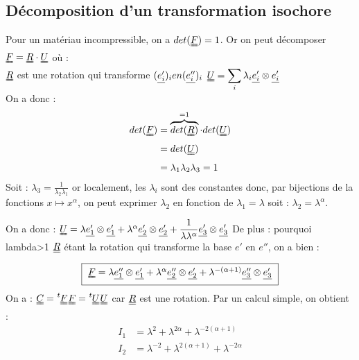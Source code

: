 \documentclass[a4paper,11pt]{article}
\newcommand{\trans}[1]{\tensor[^t]{#1}{}}
\newcommand{\SUM}{\displaystyle\sum}
\newcommand{\FRAC}{\displaystyle\frac}
\newcommand{\tens}{\uuline}
\begin{document}
\subsection{Décomposition d'un transformation isochore}
Pour un matériau incompressible, on a $det(\tens{F}) = 1$.
Or on peut décomposer $\tens{F} = \tens{R}\cdot \tens{U}$ où :\\
$\tens{R}$ est une rotation qui transforme $(\uline{e'_i})_i en (\uline{e''_i})_i$
$\tens{U} = \SUM_i \lambda_i \uline{e'_i} \otimes \uline{e'_i}$
\\
On a donc :
\begin{align*}
det(\tens{F}) &= \overbrace{det(\tens{R})}^{=1} \cdot det(\tens{U}) \\
&= det(\tens{U}) \\
&= \lambda_1 \lambda_2 \lambda_3 = 1\\
\end{align*}
Soit : $\lambda_3 = \FRAC{1}{\lambda_2 \lambda_1}$ or localement, les $\lambda_i$ sont des constantes donc, par bijections de la fonctions $x \mapsto x^\alpha$, on peut exprimer $\lambda_2$ en fonction de $\lambda_1 = \lambda$ soit : $\lambda_2 = \lambda^\alpha$.

On a donc : $\tens{U} = \lambda \uline{e'_1} \otimes \uline{e'_1} + \lambda^\alpha \uline{e'_2} \otimes \uline{e'_2} + \FRAC{1}{\lambda \lambda^\alpha} \uline{e'_3} \otimes \uline{e'_3}$
De plus : pourquoi lambda>1
$\tens{R}$ étant la rotation qui transforme la base $e'$ en $e''$, on a bien :
\begin{equation}
\fbox{
$
\tens{F} = \lambda \uline{e''_1} \otimes \uline{e'_1} + \lambda^\alpha \uline{e''_2} \otimes \uline{e'_2} + \lambda^{-(\alpha +1)} \uline{e''_3} \otimes \uline{e'_3}
$
}
\end{equation}
On a : $\tens{C} = \trans{\tens{F}} \tens{F} = \trans{\tens{U}} \tens{U}$ car $\tens{R}$ est une rotation.
Par un calcul simple, on obtient :
\begin{align*}
I_1 &= \lambda^2 + \lambda^{2 \alpha} + \lambda^{- 2 (\alpha +1)} \\
I_2 &= \lambda^{-2} + \lambda^{2 (\alpha+1)} + \lambda^{ -2 \alpha} \\
\end{align*}
\end{document}
